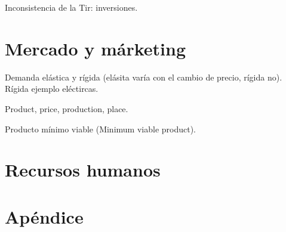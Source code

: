 \documentclass[nochap,palatino,shortheader]{apuntes}
\begin{document}
Inconsistencia de la Tir: inversiones.

\section{Mercado y márketing}

Demanda elástica y rígida (elásita varía con el cambio de precio, rígida no). Rígida ejemplo eléctircas.

Product, price, production, place.

Producto mínimo viable (Minimum viable product).

\section{Recursos humanos}

\newpage
\section{Apéndice}

\label{sec:CreacionEmpresa}

\label{sec:cicloExplotacion}
\printindex
\end{document}
